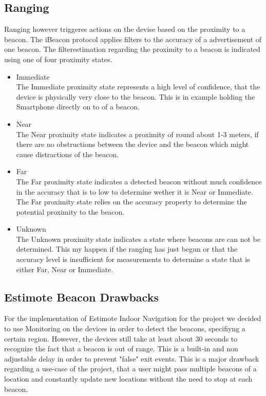 \subsection{Ranging}
Ranging however triggeres actions on the devise based on the proximity to a beacon.
The iBeacon protocol applies filters to the accuracy of a advertisement of one beacon. The filterestimation regarding the proximity to a beacon is indicated using one of four proximity states.

\begin{itemize}
\item Immediate \\
The Immediate proximity state represents a high level of confidence, that the device is physically very close to the beacon. This is in example holding the Smartphone directly on to of a beacon.
	
\item Near \\
The Near proximity state indicates a proximity of round about 1-3 meters, if there are no obstructions between the device and the beacon which might cause distractions of the beacon.

\item Far \\
The Far proximity state indicates a detected beacon without much confidence in the accuracy that is to low to determine wether it is Near or Immediate. The Far proximity state relies on the accuracy property to determine the potential proximity to the beacon.


\item Unknown\\
The Unknown proximity state indicates a state where beacons are can not be determined. This my happen if the ranging has just begun or that the accuracy level is insufficient for measurements to determine a state that is either Far, Near or Immediate.
\end{itemize}

\subsection{Estimote Beacon Drawbacks}
For the implementation of Estimote Indoor Navigation for the project we decided to use Monitoring on the devices in order to detect the beacons, specifiyng a certain region. However, the devices still take at least about 30 seconds to recognize the fact that a beacon is out of range. This is a  built-in and non adjustable delay in order to prevent "false" exit events.\cite{developerDocsEstimote} This is a major drawback regarding a use-case of the project, that a user might pass multiple beacons of a location and constantly update new locations without the need to stop at each beacon.

